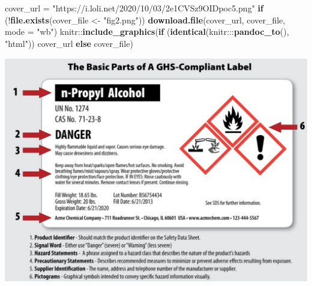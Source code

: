 \documentclass[]{tufte-book}
\newenvironment{Shaded}{}{}
\newcommand{\ControlFlowTok}[1]{\textcolor[rgb]{0.00,0.44,0.13}{\textbf{#1}}}
\newcommand{\DataTypeTok}[1]{\textcolor[rgb]{0.56,0.13,0.00}{#1}}
\newcommand{\KeywordTok}[1]{\textcolor[rgb]{0.00,0.44,0.13}{\textbf{#1}}}
\newcommand{\NormalTok}[1]{#1}
\newcommand{\OperatorTok}[1]{\textcolor[rgb]{0.40,0.40,0.40}{#1}}
\newcommand{\StringTok}[1]{\textcolor[rgb]{0.25,0.44,0.63}{#1}}
\begin{document}
\begin{Shaded}
\begin{Highlighting}[]
\NormalTok{cover_url =}\StringTok{ "https://i.loli.net/2020/10/03/2e1CVSz9OIDpoc5.png"}
\ControlFlowTok{if}\NormalTok{ (}\OperatorTok{!}\KeywordTok{file.exists}\NormalTok{(cover_file <-}\StringTok{ "fig2.png"}\NormalTok{)) }\KeywordTok{download.file}\NormalTok{(cover_url, }
\NormalTok{    cover_file, }\DataTypeTok{mode =} \StringTok{"wb"}\NormalTok{)}
\NormalTok{knitr}\OperatorTok{::}\KeywordTok{include_graphics}\NormalTok{(}\ControlFlowTok{if}\NormalTok{ (}\KeywordTok{identical}\NormalTok{(knitr}\OperatorTok{:::}\KeywordTok{pandoc_to}\NormalTok{(), }\StringTok{"html"}\NormalTok{)) cover_url }\ControlFlowTok{else}\NormalTok{ cover_file)}
\end{Highlighting}
\end{Shaded}

\includegraphics[width=20.53in]{fig2}
\end{document}
